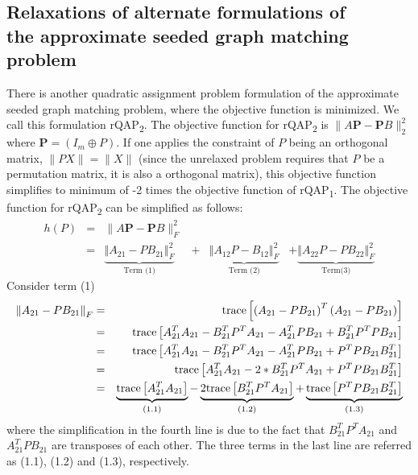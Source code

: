 \documentclass[12pt,oneside,final]{thesis}\usepackage[]{graphicx}\usepackage[]{color}
\begin{document}
\subsection{Relaxations of alternate formulations of \\ the approximate seeded graph matching problem \label{subsec:rqap2}}
There is another quadratic assignment problem formulation of  the approximate seeded graph matching problem, where the objective function is  minimized. We call this formulation rQAP\textsubscript{2}.
The objective function for rQAP\textsubscript{2} is
$\|A\bm{P}-\bm{P}B\|_2^2$ where $\bm{P}=(I_m\oplus P)$. If one applies the constraint of $P$ being an orthogonal matrix, \ie $\|PX\|=\|X\|$ (since the unrelaxed problem requires that $P$ be a permutation matrix, it is also a orthogonal matrix), this objective function simplifies to minimum of -2 times the objective function of  rQAP\textsubscript{1}. The objective function for  rQAP\textsubscript{2} can be simplified as follows:
\begin{align*}
h(P) & = & \lVert A\bm{P}-\bm{P}B\rVert _{F}^2\\
 & = & \underbrace{{\left\Vert A_{21}-PB_{21}\right\Vert _{F}^2}}_{\textrm{Term (1)}} & + & \underbrace{{\left\Vert A_{12}P-B_{12}\right\Vert _{F}^2}}_{\textrm{Term (2)}} & + \underbrace{{\left\Vert A_{22}P-PB_{22}\right\Vert _{F}^2}}_{\textrm{Term(3)} } 
\end{align*}
Consider term (1)
\begin{align*}
\left\Vert A_{21}-PB_{21}\right\Vert _{F} & = & \textup{trace}\left[\left(A_{21}-PB_{21}\right)^{T}\left(A_{21}-PB_{21}\right)\right]\\
 & = & \textup{trace}\left[A_{21}^{T}A_{21}-B_{21}^{T}P^{T}A_{21}-A_{21}^{T}PB_{21}+B_{21}^{T}P^{T}PB_{21}\right]\\
 & = & \textup{trace}\left[A_{21}^{T}A_{21}-B_{21}^{T}P^{T}A_{21}-A_{21}^{T}PB_{21}+P^{T}PB_{21}B_{21}^{T}\right]\\
 & = & \textup{trace}\left[A_{21}^{T}A_{21}-2*B_{21}^{T}P^{T}A_{21}+P^{T}PB_{21}B_{21}^{T}\right] \\
 & = & \underbrace{\textup{trace}\left[A_{21}^{T}A_{21}\right]}_{(1.1)}
 -\underbrace{2\textup{trace}\left[ B_{21}^{T}P^{T}A_{21}\right]}_{(1.2)}
 +\underbrace{\textup{trace}\left[P^{T}PB_{21}B_{21}^{T}\right]}_{(1.3)}
\end{align*}
where the simplification in the fourth line is due to the fact that $B_{21}^{T}P^{T}A_{21}$ and $A_{21}^{T}PB_{21}$
 are transposes of each other.
The three terms  in the last line are referred
as (1.1), (1.2) and (1.3), respectively.
\end{document}
